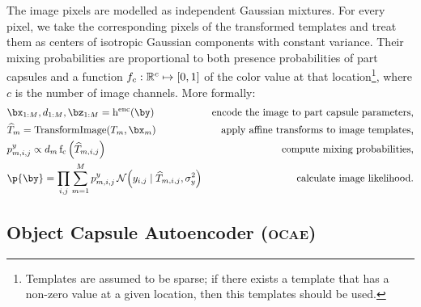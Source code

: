 The image pixels are modelled as independent Gaussian mixtures.
For every pixel, we take the corresponding pixels of the transformed templates and treat them as centers of isotropic Gaussian components with constant variance.
Their mixing probabilities are proportional to both presence probabilities of part capsules and a function $f_c: \mathbb{R}^c \mapsto {\left[0, 1\right]}$ of the color value at that location\footnote{
Templates are assumed to be sparse; if there exists a template that has a non-zero value at a given location, then this templates should be used.}, where $c$ is the number of image channels. 
More formally:
\begin{align}
    &\bx_{1:M}, d_{1:M}, \bz_{1:M} = \operatorname{h^{\mathrm{enc}}}(\by) &\text{encode the image to part capsule parameters,}\\
    &\widehat{T}_m = \operatorname{TransformImage} (T_m, \bx_m)  &\text{apply affine transforms to image templates,}\\
    &p^y_{m,i,j} \propto d_m \operatorname{f_c}\left(\widehat{T}_{m,i,j}\right) &\text{compute mixing probabilities,}\\
    &\p{\by} = \prod_{i,j} \sum_{m=1}^M p^y_{m,i,j}\, \gauss{y_{i,j} \mid \widehat{T}_{m,i,j}, \sigma^2_y} &\text{calculate image likelihood.} \label{eq:im_likelihood}
\end{align}

\subsection{Object Capsule Autoencoder (\textsc{ocae})}
\label{sec:ocae}

